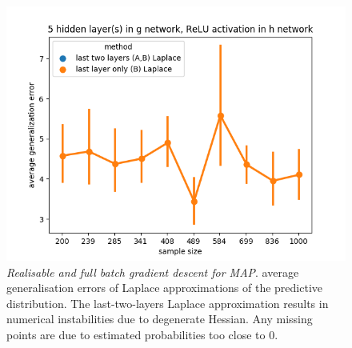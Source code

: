 \documentclass[11pt]{article}
\numberwithin{equation}{section}
\theoremstyle{plain}
\theoremstyle{definition}
\begin{document}
\begin{figure}[h!]
\begin{center}
		\includegraphics[scale=0.45]{laplace_taskid11.png}
	\end{center}
	\caption{\textit{Realisable and full batch gradient descent for MAP}. average generalisation errors of Laplace approximations of the predictive distribution. The last-two-layers Laplace approximation results in numerical instabilities due to degenerate Hessian. Any missing points are due to estimated probabilities too close to 0. 
	}
	\label{fig:avg_gen_err_fullbatch_realisable_laplace}
\end{figure}
\end{document}

